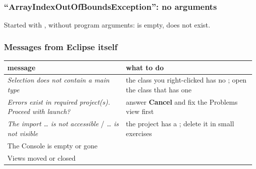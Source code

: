\documentclass[aspectratio=169,10pt,compress]{beamer}
\begin{document}
\begin{frame}[t,fragile] \frametitle{``ArrayIndexOutOfBoundsException'': no arguments}

  \vspace{0.2em}
  \small Started with , without program arguments:  is empty,  does not exist.
\end{frame}




\begin{frame}[t,fragile] \frametitle{Messages from Eclipse itself}
  \begin{center}\small
  \begin{tabular}{L{0.42\textwidth}L{0.5\textwidth}}
    \toprule
    \textbf{message}                                          & \textbf{what to do} \\
    \midrule
    \emph{Selection does not contain a main type}             & the class you right-clicked has no ; open the class that has one \\
    \emph{Errors exist in required project(s). Proceed with launch?} & answer \textbf{Cancel} and fix the Problems view first \\
    \emph{The import \dots{} is not accessible} / \emph{\dots{} is not visible} & the project has a ; delete it in small exercises \\
    The Console is empty or gone                              &  \\
    Views moved or closed                                     &  \\
    \bottomrule
  \end{tabular}
  \end{center}
\end{frame}

\end{document}
